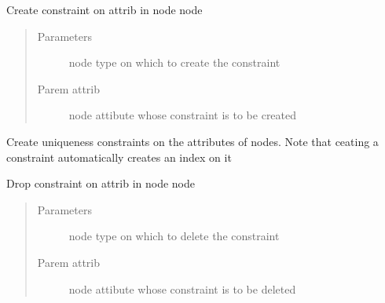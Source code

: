 \documentclass[letterpaper,10pt,english]{sphinxmanual}
\begin{document}
\begin{fulllineitems}

\begin{fulllineitems}
\label{\detokenize{neo4j_data_ingestion:ingest_neo4j_streaming.Twitter.create_constraint}}
Create constraint on attrib in node node
\begin{quote}\begin{description}
\item[{Parameters}] \leavevmode
{} \textendash{} node type on which to create the constraint

\item[{Parem attrib}] \leavevmode
node attibute whose constraint is to be created

\end{description}\end{quote}

\end{fulllineitems}


\begin{fulllineitems}
\label{\detokenize{neo4j_data_ingestion:ingest_neo4j_streaming.Twitter.create_constraints}}
Create uniqueness constraints on the attributes of nodes. Note that ceating a constraint automatically
creates an index on it

\end{fulllineitems}


\begin{fulllineitems}
\label{\detokenize{neo4j_data_ingestion:ingest_neo4j_streaming.Twitter.drop_constraint}}
Drop constraint on attrib in node node
\begin{quote}\begin{description}
\item[{Parameters}] \leavevmode
{} \textendash{} node type on which to delete the constraint

\item[{Parem attrib}] \leavevmode
node attibute whose constraint is to be deleted


\end{description}
\end{quote}
\end{fulllineitems}
\end{fulllineitems}
\end{document}
